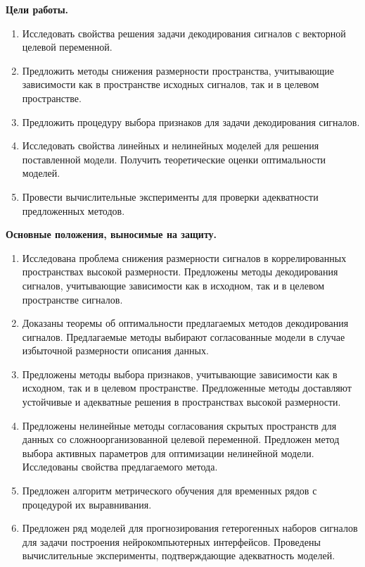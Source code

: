 \documentclass[11pt, a5paper]{dissert}
\begin{document}
\vspace{0.5cm}
\textbf{Цели работы.}
\begin{enumerate}
	\item Исследовать свойства решения задачи декодирования сигналов с векторной целевой переменной.
	\item Предложить методы снижения размерности пространства, учитывающие зависимости как в пространстве исходных сигналов, так и в целевом пространстве.
	\item Предложить процедуру выбора признаков для задачи декодирования сигналов.
	\item Исследовать свойства линейных и нелинейных моделей для решения поставленной модели. Получить теоретические оценки оптимальности моделей.
	\item Провести вычислительные эксперименты для проверки адекватности предложенных методов.
\end{enumerate}


\vspace{0.5cm}
\textbf{Основные положения, выносимые на защиту.}
\begin{enumerate}
	\item Исследована проблема снижения размерности сигналов в коррелированных пространствах высокой размерности. Предложены методы декодирования сигналов, учитывающие зависимости как в исходном, так и в целевом пространстве сигналов.
	\item Доказаны теоремы об оптимальности предлагаемых методов декодирования сигналов. Предлагаемые методы выбирают согласованные модели в случае избыточной размерности описания данных.
	\item Предложены методы выбора признаков, учитывающие зависимости как в исходном, так и в целевом пространстве. Предложенные методы доставляют устойчивые и адекватные решения в пространствах высокой размерности. 
	\item Предложены нелинейные методы согласования скрытых пространств для данных со сложноорганизованной целевой переменной. Предложен метод выбора активных параметров для оптимизации нелинейной модели. Исследованы свойства предлагаемого метода.
	\item Предложен алгоритм метрического обучения для временных рядов с процедурой их выравнивания.
	\item Предложен ряд моделей для прогнозирования гетерогенных наборов сигналов для задачи построения нейрокомпьютерных интерфейсов. Проведены вычислительные эксперименты, подтверждающие адекватность моделей.
\end{enumerate}
\end{document}
